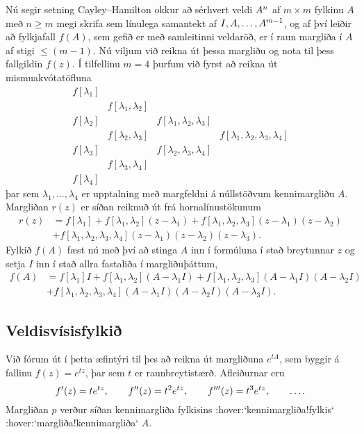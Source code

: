 \noindent
 Nú segir setning
Cayley--Hamilton okkur að sérhvert veldi $A\sp n$ af 
$m\times m$ fylkinu  $A$ með $n\geq
m$ megi skrifa sem línulega samantekt af $I,A,\dots, A\sp {m-1}$, og
af því leiðir að fylkjafall $f(A)$, sem gefið er
með samleitinni veldaröð, er í raun margliða í $A$ af stigi $\leq
(m-1)$.  Nú viljum við reikna út þessa margliðu og nota til þess
fallgildin $f(z)$.  Í tilfellinu $m=4$ þurfum við fyrst að reikna
út mismuakvótatöfluna
 $$\begin{matrix}
f[\lambda_1]\\
            &f[\lambda_1,\lambda_2]\\
f[\lambda_2]&                       &f[\lambda_1, \lambda_2, \lambda_3]\\
        &f[\lambda_2,\lambda_3]& &f[\lambda_1,\lambda_2,\lambda_3,\lambda_4]\\
f[\lambda_3]&                       &f[\lambda_2, \lambda_3, \lambda_4]\\
            &f[\lambda_3,\lambda_4]\\
f[\lambda_4]
\end{matrix}
 $$
þar sem $\lambda_1,\dots,\lambda_4$ er upptalning með margfeldni
á núllstöðvum kennimargliðu $A$.
Margliðan $r(z)$ er síðan reiknuð út frá hornalínustökunum
\begin{align*}
r(z)&=f[\lambda_1]+f[\lambda_1,\lambda_2](z-\lambda_1)
+f[\lambda_1, \lambda_2, \lambda_3](z-\lambda_1)(z-\lambda_2)\\
&+f[\lambda_1, \lambda_2, \lambda_3,\lambda_4]
(z-\lambda_1)(z-\lambda_2)(z-\lambda_3).
\end{align*}
Fylkið $f(A)$ fæst nú með því að stinga $A$ inn í formúluna í stað 
breytunnar $z$ og setja $I$ inn í stað allra fastaliða í
margliðuþáttum,
\begin{align*}
f(A)&=f[\lambda_1]I+f[\lambda_1,\lambda_2](A-\lambda_1I)
+f[\lambda_1, \lambda_2, \lambda_3](A-\lambda_1I)(A-\lambda_2I)\\
&+f[\lambda_1, \lambda_2, \lambda_3,\lambda_4]
(A-\lambda_1I)(A-\lambda_2I)(A-\lambda_3I).
\end{align*}

\subsection*{Veldisvísisfylkið}

Við fórum út í þetta æfintýri til þes að reikna út margliðuna
$e^{tA}$, sem byggir á fallinu $f(z)=e^{tz}$, þar sem $t$ er
raunbreytistærð.  Afleiðurnar eru
 $$f{\sp{\prime}}(z)=te^{tz}, \qquad f{\sp{\prime\prime}}(z)=t^2e^{tz}, \qquad
f{\sp{\prime\prime\prime}}(z)=t^3e^{tz}, \qquad \dots.
 $$
Margliðan $p$ verður síðan kennimargliða
fylkisins :hover:`kennimargliða!fylkis` :hover:`margliða!kennimargliða` $A$.


